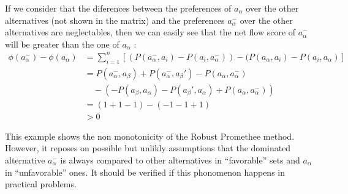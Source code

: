 If we consider that the diferences between the preferences of $a_\alpha$ over the other alternatives (not shown in the matrix) and the preferences $a_\alpha ^-$ over the other alternatives are neglectables, then we can easily see that the net flow score of $a_\alpha^-$ will be greater than the one of $a_\alpha$ :
\begin{equation}
    \begin{split}
        \phi(a_\alpha^-) - \phi(a_\alpha) & = \sum\limits_{i=1}^n \left[ (P(a_\alpha^-, a_i) - P(a_i, a_\alpha^-)) - (P(a_\alpha, a_i) - P(a_i, a_\alpha)  \right] \\
        & = P(a_\alpha^-,a_\beta) + P(a_\alpha^-,a_\beta') - P(a_\alpha, a_\alpha^-)  \\ 
        & \quad - (- P(a_\beta,a_\alpha) - P(a_\beta',a_\alpha) + P(a_\alpha, a_\alpha^-)) \\
        & = (1 + 1 -1 ) - (- 1 -1 +1) \\
        & > 0
    \end{split}
    \label{dem:non_monotony}
\end{equation}

This example shows the non monotonicity of the Robust Promethee method. However, it reposes on possible but unlikly assumptions that the dominated alternative $a_\alpha^-$ is always compared to other alternatives in ``favorable'' sets and $a_\alpha$ in ``unfavorable'' ones. It should be verified if this phonomenon happens in practical problems.
